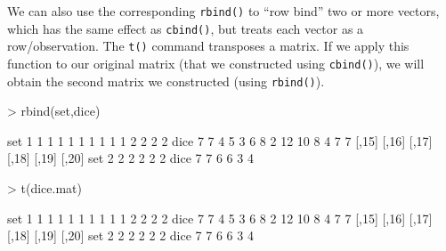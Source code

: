\documentclass[12pt]{article}
\begin{document}
We can also use the corresponding \verb|rbind()| to ``row bind'' two or more vectors, which has the same effect as \verb|cbind()|, but treats each vector as a row/observation. The \verb|t()| command transposes a matrix. If we apply this function to our original matrix (that we constructed using \verb|cbind()|), we will obtain the second matrix we constructed (using \verb|rbind()|).
\begin{Schunk}
\begin{Sinput}
> rbind(set,dice)
\end{Sinput}
\begin{Soutput}
     [,1] [,2] [,3] [,4] [,5] [,6] [,7] [,8] [,9] [,10] [,11] [,12] [,13] [,14]
set     1    1    1    1    1    1    1    1    1     1     2     2     2     2
dice    7    7    4    5    3    6    8    2   12    10     8     4     7     7
     [,15] [,16] [,17] [,18] [,19] [,20]
set      2     2     2     2     2     2
dice     7     7     6     6     3     4
\end{Soutput}
\begin{Sinput}
> t(dice.mat)
\end{Sinput}
\begin{Soutput}
     [,1] [,2] [,3] [,4] [,5] [,6] [,7] [,8] [,9] [,10] [,11] [,12] [,13] [,14]
set     1    1    1    1    1    1    1    1    1     1     2     2     2     2
dice    7    7    4    5    3    6    8    2   12    10     8     4     7     7
     [,15] [,16] [,17] [,18] [,19] [,20]
set      2     2     2     2     2     2
dice     7     7     6     6     3     4
\end{Soutput}
\end{Schunk}
\end{document}
